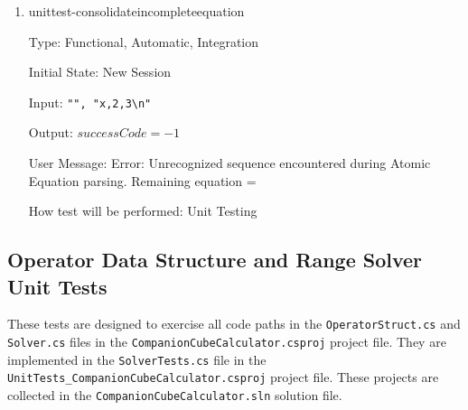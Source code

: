 \documentclass[12pt, titlepage]{article}
\begin{document}
\begin{enumerate}
	\item{unittest-consolidateincompleteequation}
	
	Type: Functional, Automatic, Integration
	
	Initial State: New Session
	
	Input: \texttt{"", "x,2,3\textbackslash n"}
	
	Output: $successCode = -1$
	
	User Message: Error: Unrecognized sequence encountered during Atomic 
	Equation parsing. Remaining equation = 
	
	How test will be performed: Unit Testing\\
	
	
\end{enumerate}

\subsection{Operator Data Structure and Range Solver Unit Tests}
These tests are designed to exercise all code paths in the 
\texttt{OperatorStruct.cs} and \texttt{Solver.cs} 
files in the \texttt{CompanionCubeCalculator.csproj} project file. They are 
implemented in the \texttt{SolverTests.cs} file in the \\
\texttt{UnitTests\_CompanionCubeCalculator.csproj} project file. These projects 
are collected in the \texttt{CompanionCubeCalculator.sln} solution file.
\end{document}

